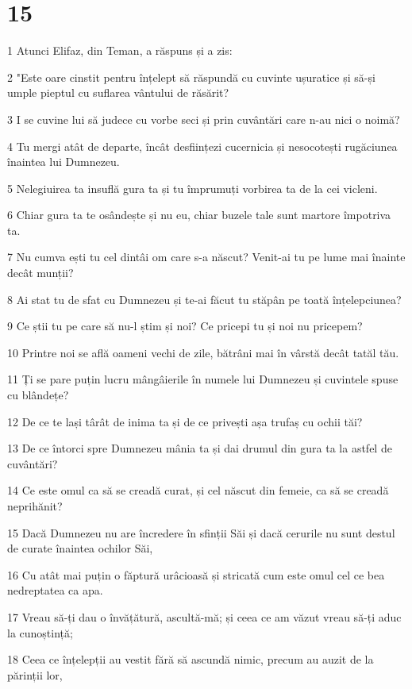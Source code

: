\chapter{15}

\par 1 Atunci Elifaz, din Teman, a răspuns și a zis:
\par 2 "Este oare cinstit pentru înțelept să răspundă cu cuvinte ușuratice și să-și umple pieptul cu suflarea vântului de răsărit?
\par 3 I se cuvine lui să judece cu vorbe seci și prin cuvântări care n-au nici o noimă?
\par 4 Tu mergi atât de departe, încât desființezi cucernicia și nesocotești rugăciunea înaintea lui Dumnezeu.
\par 5 Nelegiuirea ta insuflă gura ta și tu împrumuți vorbirea ta de la cei vicleni.
\par 6 Chiar gura ta te osândește și nu eu, chiar buzele tale sunt martore împotriva ta.
\par 7 Nu cumva ești tu cel dintâi om care s-a născut? Venit-ai tu pe lume mai înainte decât munții?
\par 8 Ai stat tu de sfat cu Dumnezeu și te-ai făcut tu stăpân pe toată înțelepciunea?
\par 9 Ce știi tu pe care să nu-l știm și noi? Ce pricepi tu și noi nu pricepem?
\par 10 Printre noi se află oameni vechi de zile, bătrâni mai în vârstă decât tatăl tău.
\par 11 Ți se pare puțin lucru mângâierile în numele lui Dumnezeu și cuvintele spuse cu blândețe?
\par 12 De ce te lași târât de inima ta și de ce privești așa trufaș cu ochii tăi?
\par 13 De ce întorci spre Dumnezeu mânia ta și dai drumul din gura ta la astfel de cuvântări?
\par 14 Ce este omul ca să se creadă curat, și cel născut din femeie, ca să se creadă neprihănit?
\par 15 Dacă Dumnezeu nu are încredere în sfinții Săi și dacă cerurile nu sunt destul de curate înaintea ochilor Săi,
\par 16 Cu atât mai puțin o făptură urâcioasă și stricată cum este omul cel ce bea nedreptatea ca apa.
\par 17 Vreau să-ți dau o învățătură, ascultă-mă; și ceea ce am văzut vreau să-ți aduc la cunoștință;
\par 18 Ceea ce înțelepții au vestit fără să ascundă nimic, precum au auzit de la părinții lor,
